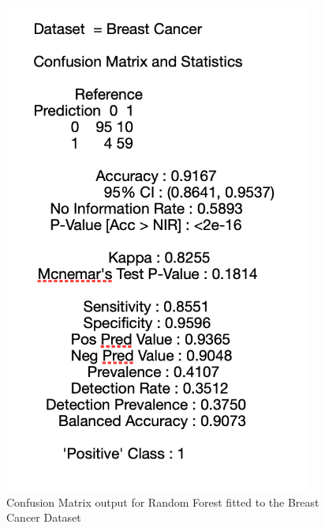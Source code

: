 \begin{figure}[!htbp]
\begin{minipage}{0.45\textwidth}
        \includegraphics[width=0.9\textwidth]{ThesisTemplate/appendix/images/Chapter5Appendix/ConfusionMatrix/BreastCancer.png} 
        \caption{Confusion Matrix output for Random Forest fitted to the Breast Cancer Dataset}
        \label{fig:my_label}
    \end{minipage}
\end{figure}

